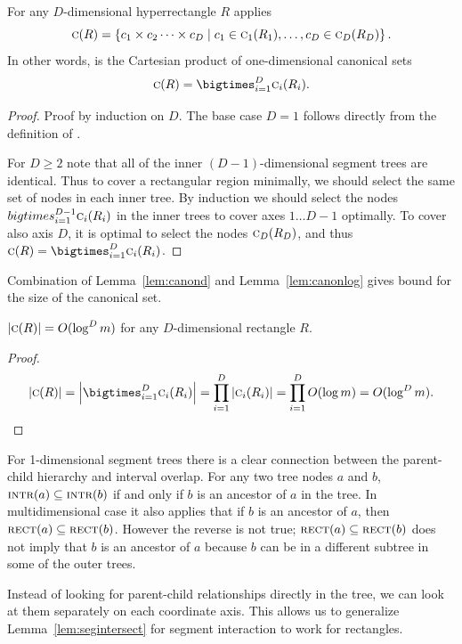 \documentclass[english,gradu]{tktltiki2018}
\begin{document}
\begin{lem}\label{lem:canond}
For any $D$-dimensional hyperrectangle $R$ applies
$$\canon{R}=\set{c_1\times c_2\dots\times c_D \mid c_1\in\canoni{R_1}{1}, \dots, c_D\in\canoni{R_D}{D}}.$$
In other words,  is the Cartesian product of one-dimensional canonical sets
$$\canon{R}=\bigtimes_{i=1}^D \canoni{R_i}{i}.$$
\end{lem}
\begin{proof}
Proof by induction on $D$.
The base case $D=1$ follows directly from the definition of .

For $D\ge 2$ note that all of the inner $(D-1)$-dimensional segment trees are identical.
Thus to cover a rectangular region minimally, we should select the same set of nodes in each inner tree.
By induction we should select the nodes $bigtimes_{i=1}^{D-1} \canoni{R_i}{i}$ in the inner trees to cover axes $1\dots D-1$ optimally.
To cover also axis $D$, it is optimal to select the nodes $\canoni{R_D}{D}$, and thus $\canon{R}=\bigtimes_{i=1}^D\canoni{R_i}{i}$.
\end{proof}

Combination of Lemma~\ref{lem:canond} and Lemma~\ref{lem:canonlog} gives bound for the size of the canonical set.

\begin{lem}$\size{\canon{R}}=O(\log^D\segsize)$ for any $D$-dimensional rectangle $R$.\end{lem}
\begin{proof}
$$
\size{\canon{R}} = \size{\bigtimes_{i=1}^D \canoni{R_i}{i}}
= \prod_{i=1}^D \size{\canoni{R_i}{i}}
= \prod_{i=1}^D O(\log\segsize)
= O(\log^D\segsize).
$$
\end{proof}

For 1-dimensional segment trees there is a clear connection between the parent-child hierarchy and interval overlap.
For any two tree nodes $a$ and $b$, $\inter{a}\subseteq\inter{b}$ if and only if $b$ is an ancestor of $a$ in the tree.
In multidimensional case it also applies that if $b$ is an ancestor of $a$, then $\rect{a}\subseteq\rect{b}$.
However the reverse is not true; $\rect{a}\subseteq\rect{b}$ does not imply that $b$ is an ancestor of $a$ because $b$ can be in a different subtree in some of the outer trees.

Instead of looking for parent-child relationships directly in the tree, we can look at them separately on each coordinate axis.
This allows us to generalize Lemma~\ref{lem:segintersect} for segment interaction to work for rectangles.
\end{document}
